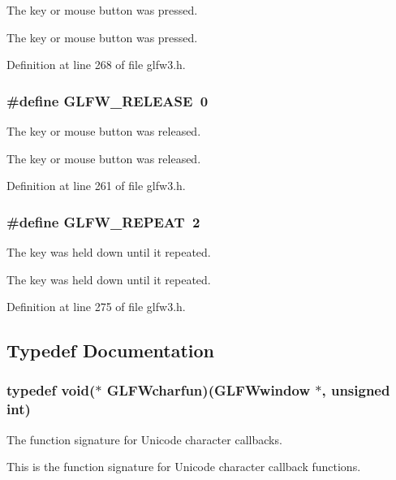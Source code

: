 The key or mouse button was pressed. 

The key or mouse button was pressed. 

Definition at line 268 of file glfw3.h.\hypertarget{group__input_gda11d965c4da13090ad336e030e4d11f}{
\subsubsection[GLFW\_\-RELEASE]{\setlength{\rightskip}{0pt plus 5cm}\#define GLFW\_\-RELEASE~0}}
\label{group__input_gda11d965c4da13090ad336e030e4d11f}


The key or mouse button was released. 

The key or mouse button was released. 

Definition at line 261 of file glfw3.h.\hypertarget{group__input_gc96fd3b9fc66c6f0eebaf6532595338f}{
\subsubsection[GLFW\_\-REPEAT]{\setlength{\rightskip}{0pt plus 5cm}\#define GLFW\_\-REPEAT~2}}
\label{group__input_gc96fd3b9fc66c6f0eebaf6532595338f}


The key was held down until it repeated. 

The key was held down until it repeated. 

Definition at line 275 of file glfw3.h.

\subsection{Typedef Documentation}
\hypertarget{group__input_g1103f1876518acecb5976f6b307c51d1}{
\subsubsection[GLFWcharfun]{\setlength{\rightskip}{0pt plus 5cm}typedef void($\ast$  {\bf GLFWcharfun})({\bf GLFWwindow} $\ast$, unsigned int)}}
\label{group__input_g1103f1876518acecb5976f6b307c51d1}


The function signature for Unicode character callbacks. 

This is the function signature for Unicode character callback functions.

